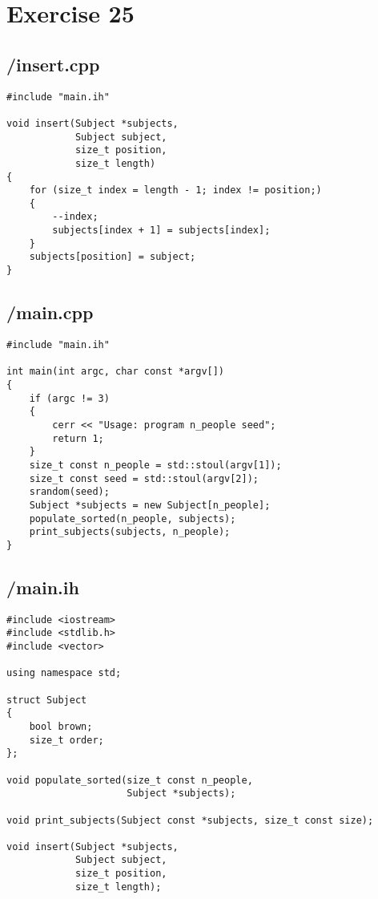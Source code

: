 \documentclass{article}
\begin{document}
\section*{Exercise 25}
\subsection*{/insert.cpp}
\begin{verbatim}
#include "main.ih"

void insert(Subject *subjects, 
            Subject subject,
            size_t position, 
            size_t length)
{
    for (size_t index = length - 1; index != position;)
    {
        --index;
        subjects[index + 1] = subjects[index];
    }
    subjects[position] = subject;
}
\end{verbatim}
\subsection*{/main.cpp}
\begin{verbatim}
#include "main.ih"

int main(int argc, char const *argv[])
{
    if (argc != 3)
    {
        cerr << "Usage: program n_people seed";
        return 1;
    }
    size_t const n_people = std::stoul(argv[1]);
    size_t const seed = std::stoul(argv[2]);
    srandom(seed);
    Subject *subjects = new Subject[n_people];
    populate_sorted(n_people, subjects);
    print_subjects(subjects, n_people);
}

\end{verbatim}
\subsection*{/main.ih}
\begin{verbatim}
#include <iostream>
#include <stdlib.h>
#include <vector>

using namespace std;

struct Subject
{
    bool brown;
    size_t order;
};

void populate_sorted(size_t const n_people, 
                     Subject *subjects);

void print_subjects(Subject const *subjects, size_t const size);

void insert(Subject *subjects, 
            Subject subject,
            size_t position, 
            size_t length);

\end{verbatim}
\end{document}
